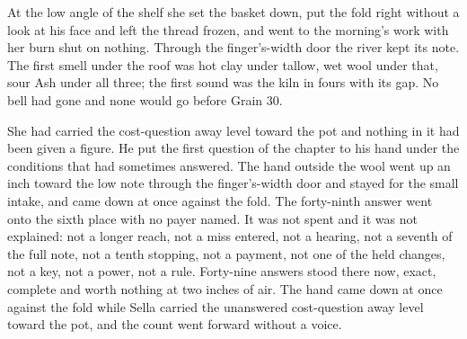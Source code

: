 At the low angle of the shelf she set the basket down, put the fold right without a look at his face and left the thread frozen, and went to the morning's work with her burn shut on nothing. Through the finger's-width door the river kept its note. The first smell under the roof was hot clay under tallow, wet wool under that, sour Ash under all three; the first sound was the kiln in fours with its gap. No bell had gone and none would go before Grain 30.

She had carried the cost-question away level toward the pot and nothing in it had been given a figure. He put the first question of the chapter to his hand under the conditions that had sometimes answered. The hand outside the wool went up an inch toward the low note through the finger's-width door and stayed for the small intake, and came down at once against the fold. The forty-ninth answer went onto the sixth place with no payer named. It was not spent and it was not explained: not a longer reach, not a miss entered, not a hearing, not a seventh of the full note, not a tenth stopping, not a payment, not one of the held changes, not a key, not a power, not a rule. Forty-nine answers stood there now, exact, complete and worth nothing at two inches of air. The hand came down at once against the fold while Sella carried the unanswered cost-question away level toward the pot, and the count went forward without a voice.
